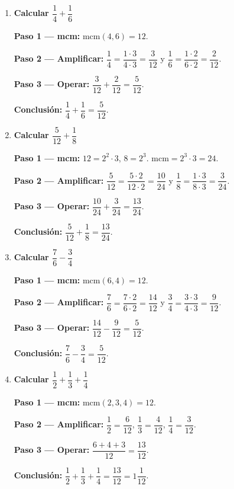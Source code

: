 \documentclass[11pt, letterpaper]{article}
\begin{document}
\begin{tcolorbox}[examplebox, title={Ejemplos --- suma y resta con amplificaci\'on}]
\begin{enumerate}[label=\textbf{Ej. \arabic*.}, leftmargin=*, itemsep=14pt]

\item \textbf{Calcular $\dfrac{1}{4} + \dfrac{1}{6}$}

\textbf{Paso 1 --- mcm:} $\text{mcm}(4,6) = 12$.

\textbf{Paso 2 --- Amplificar:} $\dfrac{1}{4} = \dfrac{1\cdot3}{4\cdot3} = \dfrac{3}{12}$ \quad y \quad $\dfrac{1}{6} = \dfrac{1\cdot2}{6\cdot2} = \dfrac{2}{12}$.

\textbf{Paso 3 --- Operar:} $\dfrac{3}{12} + \dfrac{2}{12} = \dfrac{5}{12}$.

\textbf{Conclusi\'on:} $\dfrac{1}{4} + \dfrac{1}{6} = \dfrac{5}{12}$. \checkmark

\item \textbf{Calcular $\dfrac{5}{12} + \dfrac{1}{8}$}

\textbf{Paso 1 --- mcm:} $12 = 2^2\cdot3$, $8 = 2^3$. $\text{mcm} = 2^3\cdot3 = 24$.

\textbf{Paso 2 --- Amplificar:} $\dfrac{5}{12} = \dfrac{5\cdot2}{12\cdot2} = \dfrac{10}{24}$ \quad y \quad $\dfrac{1}{8} = \dfrac{1\cdot3}{8\cdot3} = \dfrac{3}{24}$.

\textbf{Paso 3 --- Operar:} $\dfrac{10}{24} + \dfrac{3}{24} = \dfrac{13}{24}$.

\textbf{Conclusi\'on:} $\dfrac{5}{12} + \dfrac{1}{8} = \dfrac{13}{24}$. \checkmark

\item \textbf{Calcular $\dfrac{7}{6} - \dfrac{3}{4}$}

\textbf{Paso 1 --- mcm:} $\text{mcm}(6,4) = 12$.

\textbf{Paso 2 --- Amplificar:} $\dfrac{7}{6} = \dfrac{7\cdot2}{6\cdot2} = \dfrac{14}{12}$ \quad y \quad $\dfrac{3}{4} = \dfrac{3\cdot3}{4\cdot3} = \dfrac{9}{12}$.

\textbf{Paso 3 --- Operar:} $\dfrac{14}{12} - \dfrac{9}{12} = \dfrac{5}{12}$.

\textbf{Conclusi\'on:} $\dfrac{7}{6} - \dfrac{3}{4} = \dfrac{5}{12}$. \checkmark

\item \textbf{Calcular $\dfrac{1}{2} + \dfrac{1}{3} + \dfrac{1}{4}$}

\textbf{Paso 1 --- mcm:} $\text{mcm}(2,3,4) = 12$.

\textbf{Paso 2 --- Amplificar:} $\dfrac{1}{2}=\dfrac{6}{12}$, \quad $\dfrac{1}{3}=\dfrac{4}{12}$, \quad $\dfrac{1}{4}=\dfrac{3}{12}$.

\textbf{Paso 3 --- Operar:} $\dfrac{6+4+3}{12} = \dfrac{13}{12}$.

\textbf{Conclusi\'on:} $\dfrac{1}{2}+\dfrac{1}{3}+\dfrac{1}{4} = \dfrac{13}{12} = 1\dfrac{1}{12}$. \checkmark

\end{enumerate}
\end{tcolorbox}
\end{document}
